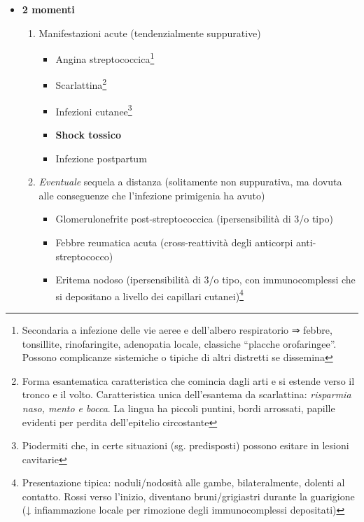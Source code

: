 \documentclass[italian,]{article}
\providecommand{\tightlist}{%
  \setlength{\itemsep}{0pt}\setlength{\parskip}{0pt}}
\begin{document}
\begin{itemize}
\tightlist
\item
  \textbf{2 momenti}

  \begin{enumerate}
  \def\labelenumi{\arabic{enumi}.}
  \tightlist
  \item
    Manifestazioni acute (tendenzialmente suppurative)

    \begin{itemize}
    \tightlist
    \item
      Angina streptococcica\footnote{Secondaria a infezione delle vie
        aeree e dell'albero respiratorio ⇒ febbre, tonsillite,
        rinofaringite, adenopatia locale, classiche ``placche
        orofaringee''. Possono complicanze sistemiche o tipiche di altri
        distretti se dissemina}
    \item
      Scarlattina\footnote{Forma esantematica caratteristica che
        comincia dagli arti e si estende verso il tronco e il volto.
        Caratteristica unica dell'esantema da scarlattina:
        \emph{risparmia naso, mento e bocca}. La lingua ha piccoli
        puntini, bordi arrossati, papille evidenti per perdita
        dell'epitelio circostante}
    \item
      Infezioni cutanee\footnote{Piodermiti che, in certe situazioni
        (sg. predisposti) possono esitare in lesioni cavitarie}
    \item
      \textbf{Shock tossico}
    \item
      Infezione postpartum
    \end{itemize}
  \item
    \emph{Eventuale} sequela a distanza (solitamente non suppurativa, ma
    dovuta alle conseguenze che l'infezione primigenia ha avuto)

    \begin{itemize}
    \tightlist
    \item
      Glomerulonefrite post-streptococcica (ipersensibilità di 3/o tipo)
    \item
      Febbre reumatica acuta (cross-reattività degli anticorpi
      anti-streptococco)
    \item
      Eritema nodoso (ipersensibilità di 3/o tipo, con immunocomplessi
      che si depositano a livello dei capillari cutanei)\footnote{Presentazione
        tipica: noduli/nodosità alle gambe, bilateralmente, dolenti al
        contatto. Rossi verso l'inizio, diventano bruni/grigiastri
        durante la guarigione (↓ infiammazione locale per rimozione
        degli immunocomplessi depositati)}
    \end{itemize}
  \end{enumerate}
\end{itemize}
\end{document}

